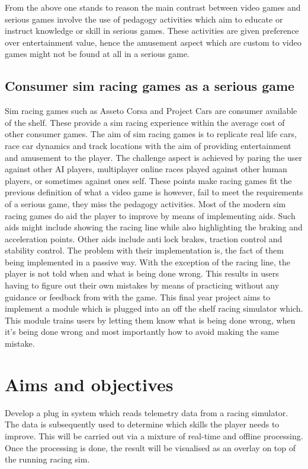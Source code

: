 \documentclass{article}
\begin{document}
From the above one stands to reason the main contrast between video games and serious games involve the use of pedagogy activities which aim to educate or instruct knowledge or skill\cite{zyda2005visual} in serious games. These activities are given preference over entertainment value, hence the amusement aspect which are custom to video games might not be found at all in a serious game\cite{zyda2005visual}.

\subsection{Consumer sim racing games as a serious game}

Sim racing games such as Asseto Corsa and Project Cars are consumer available of the shelf. These provide a sim racing experience within the average cost of other consumer games. The aim of sim racing games is to replicate real life cars, race car dynamics and track locations with the aim of providing entertainment and amusement to the player. The challenge aspect is achieved by paring the user against other AI players, multiplayer online races played against other human players, or sometimes against ones self. These points make racing games fit the previous definition of what a video game is however, fail to meet the requirements of a serious game, they miss the pedagogy activities. Most of the modern sim racing games do aid the player to improve by means of implementing aids. Such aids might include showing the racing line while also highlighting the braking and acceleration points. Other aids include anti lock brakes, traction control and stability control. The problem with their implementation is, the fact of them being implemented in a passive way. With the exception of the racing line, the player is not told when and what is being done wrong. This results in users having to figure out their own mistakes by means of practicing without any guidance or feedback from with the game. This final year project aims to implement a module which is plugged into an off the shelf racing simulator which. This module trains users by letting them know what is being done wrong, when it's being done wrong and most importantly how to avoid making the same mistake.

\section{Aims and objectives}

Develop a plug in system which reads telemetry data from a racing simulator. The data is subsequently used to determine which skills the player needs to improve. This will be carried out via a mixture of real-time and offline processing. Once the processing is done, the result will be visualised as an overlay on top of the running racing sim.
\end{document}

